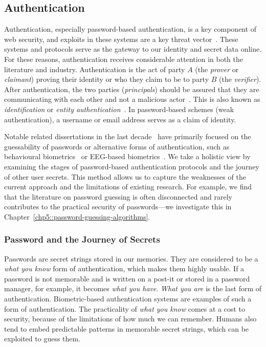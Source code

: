 \subsection{Authentication}
\label{sec::chp1::authentication}

Authentication, especially password-based authentication, is a key component of web security, and exploits in these systems are a key threat vector~\cite{verizon_2024_2024}. These systems and protocols serve as the gateway to our identity and secret data online. For these reasons, authentication receives considerable attention in both the literature and industry. Authentication is the act of party $A$ (the \textit{prover} or \textit{claimant}) proving their identity or who they claim to be to party $B$ (the \textit{verifier}). After authentication, the two parties (\textit{principals}) should be assured that they are communicating with each other and not a malicious actor~\cite{burrows_logic_1990}. This is also known as \textit{identification} or \textit{entity authentication}~\cite{menezes_handbook_1997}. In password-based schemes (weak authentication), a username or email address serves as a claim of identity.

Notable related dissertations in the last decade~\cite{bonneau_guessing_2012, pasquini_enabling_2021, ur_supporting_2016} have primarily focused on the guessability of passwords or alternative forms of authentication, such as behavioural biometrics~\cite{drosou_activity_2013} or EEG-based biometrics~\cite{nakamura_wearable_2019}. We take a holistic view by examining the stages of password-based authentication protocols and the journey of other user secrets. This method allows us to capture the weaknesses of the current approach and the limitations of existing research. For example, we find that the literature on password guessing is often disconnected and rarely contributes to the practical security of passwords---we investigate this in Chapter~\ref{chp5::password-guessing-algorithms}.

\subsubsection{Password and the Journey of Secrets}

Passwords are secret strings stored in our memories. They are considered to be a \textit{what you know} form of authentication, which makes them highly usable. If a password is not memorable and is written on a post-it or stored in a password manager, for example, it becomes \textit{what you have}. \textit{What you are} is the last form of authentication. Biometric-based authentication systems are examples of such a form of authentication. The practicality of \textit{what you know} comes at a cost to security, because of the limitations of how much we can remember. Humans also tend to embed predictable patterns in memorable secret strings, which can be exploited to guess them.

